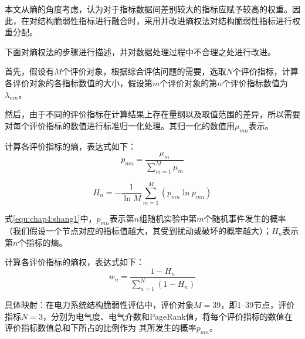 

本文从熵的角度考虑，认为对于指标数据间差别较大的指标应赋予较高的权重。因此，在对结构脆弱性指标进行融合时，采用并改进熵权法对结构脆弱性指标进行权重分配。

下面对熵权法的步骤进行描述，并对数据处理过程中不合理之处进行改进。

首先，假设有$M$个评价对象，根据综合评估问题的需要，选取$N$个评价指标，计算各评价对象的各指标数值的大小，假设第$m$个评价对象的第$n$个评价指标数值为$\lambda_{mn}$。

然后，由于不同的评价指标在计算结果上存在量纲以及取值范围的差异，所以需要对每个评价指标的数值进行标准归一化处理。其归一化的数值用$\mu_{mn}$表示。

计算各评价指标的熵，表达式如下：
\begin{equation}
\label{equ:chap4:shang1}
  p_{m n}=\frac{\mu_{m}}{\sum_{m=1}^{M} \mu_{m}}
  \end{equation}

\begin{equation}
  H_{n}=-\frac{1}{\ln M} \sum_{m=1}^{M}\left(p_{m n} \ln p_{m n}\right)
  \end{equation}

式\ref{equ:chap4:shang1}中，$p_{mn}$表示第$n$组随机实验中第$m$个随机事件发生的概率（我们假设一个节点对应的指标值越大，其受到扰动或破坏的概率越大）；$H_n$表示第$n$个指标的熵\cite{refs76}。

计算各评价指标的熵权，表达式如下：
\begin{equation}
  w_{n}=\frac{1-H_{n}}{\sum_{n=1}^{N}\left(1-H_{n}\right)}
  \end{equation}

具体映射：在电力系统结构脆弱性评估中，评价对象$M=39$，即1--39节点，评价指标$N=3$，分别为电气度、电气介数和PageRank值，将每个评价指标的数值在评价指标数值总和下所占的比例作为
其所发生的概率$p_{mn}$。

